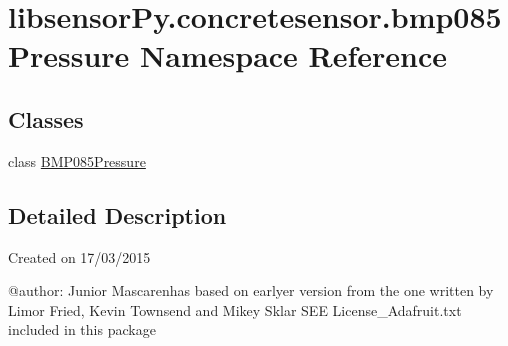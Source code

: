 \hypertarget{namespacelibsensorPy_1_1concretesensor_1_1bmp085Pressure}{}\section{libsensor\+Py.\+concretesensor.\+bmp085\+Pressure Namespace Reference}
\label{namespacelibsensorPy_1_1concretesensor_1_1bmp085Pressure}
\subsection*{Classes}
\begin{DoxyCompactItemize}
\item 
class \hyperlink{classlibsensorPy_1_1concretesensor_1_1bmp085Pressure_1_1BMP085Pressure}{B\+M\+P085\+Pressure}
\end{DoxyCompactItemize}


\subsection{Detailed Description}
\begin{DoxyVerb}Created on 17/03/2015

@author: Junior Mascarenhas
based on earlyer version from
the one written by Limor Fried, Kevin Townsend and Mikey Sklar
SEE License_Adafruit.txt included in this package
\end{DoxyVerb}
 